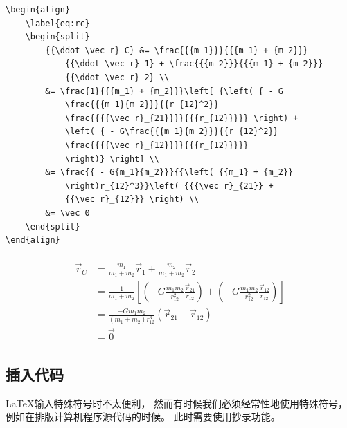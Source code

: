 \documentclass[UTF8]{ctexart}
\numberwithin{equation}{section}			%
\begin{document}
\begin{lstlisting}
\begin{align}
    \label{eq:rc}
    \begin{split}
        {{\ddot \vec r}_C} &= \frac{{{m_1}}}{{{m_1} + {m_2}}}
            {{\ddot \vec r}_1} + \frac{{{m_2}}}{{{m_1} + {m_2}}}
            {{\ddot \vec r}_2} \\ 
        &= \frac{1}{{{m_1} + {m_2}}}\left[ {\left( { - G
            \frac{{{m_1}{m_2}}}{{r_{12}^2}}
            \frac{{{{\vec r}_{21}}}}{{{r_{12}}}}} \right) + 
            \left( { - G\frac{{{m_1}{m_2}}}{{r_{12}^2}}
            \frac{{{{\vec r}_{12}}}}{{{r_{12}}}}} 
            \right)} \right] \\ 
        &= \frac{{ - G{m_1}{m_2}}}{{\left( {{m_1} + {m_2}}
            \right)r_{12}^3}}\left( {{{\vec r}_{21}} + 
            {{\vec r}_{12}}} \right) \\ 
        &= \vec 0 
    \end{split}
\end{align}
\end{lstlisting}
    \begin{align}
        \label{eq:rc}
        \begin{split}
            {{\ddot \vec r}_C} &= \frac{{{m_1}}}{{{m_1} + {m_2}}}
            {{\ddot \vec r}_1} + \frac{{{m_2}}}{{{m_1} + {m_2}}}
            {{\ddot \vec r}_2} \\ 
            &= \frac{1}{{{m_1} + {m_2}}}\left[ {\left( { - G
                \frac{{{m_1}{m_2}}}{{r_{12}^2}}
                \frac{{{{\vec r}_{21}}}}{{{r_{12}}}}} \right) + 
                \left( { - G\frac{{{m_1}{m_2}}}{{r_{12}^2}}
                \frac{{{{\vec r}_{12}}}}{{{r_{12}}}}} 
                \right)} \right] \\ 
            &= \frac{{ - G{m_1}{m_2}}}{{\left( {{m_1} + {m_2}}
                \right)r_{12}^3}}\left( {{{\vec r}_{21}} + 
                {{\vec r}_{12}}} \right) \\ 
            &= \vec 0 
        \end{split}
    \end{align}
    
    \subsection{插入代码}
    \LaTeX 输入特殊符号时不太便利，
    然而有时候我们必须经常性地使用特殊符号，
    例如在排版计算机程序源代码的时候。
    此时需要使用抄录功能。
    
\end{document}
